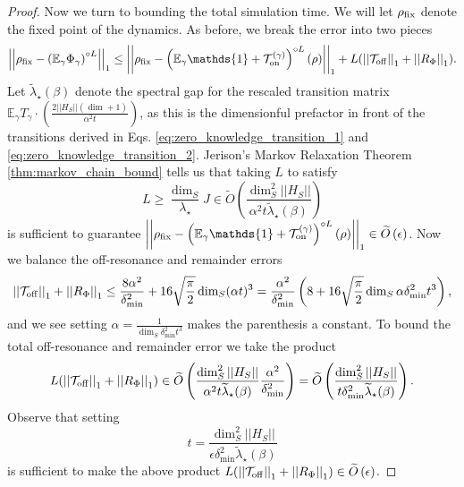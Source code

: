 \documentclass{article}
\newcommand{\on}{\rm on}
\newcommand{\off}{\rm off}
\newcommand{\norm}[1]{\left|\left| #1 \right|\right|}
\newcommand{\EE}{\mathbb{E}}
\newcommand{\TT}{\mathcal{T}}
\newcommand{\bigotilde}[1]{\widetilde{O} \left( #1 \right)}
\newcommand{\identity}{\mathds{1}}
\begin{document}
\begin{proof}
    Now we turn to bounding the total simulation time. We will let $\rho_{\rm fix}$ denote the fixed point of the dynamics. As before, we break the error into two pieces
    \begin{equation}
        \norm{\rho_{\rm fix} - \left(\EE_\gamma \Phi_\gamma \right)^{\circ L}}_1 \le \norm{\rho_{\rm fix} - \left(\EE_\gamma \identity + \TT_{\on}^{(\gamma)}\right)^{\circ L} (\rho)}_1 + L(\norm{\TT_{\off}}_1 + \norm{R_{\Phi}}_1).
    \end{equation}
    Let $\widetilde{\lambda}_\star(\beta)$ denote the spectral gap for the rescaled transition matrix $\EE_\gamma T_\gamma \cdot \left(\frac{2 \norm{H_S} (\dim + 1)}{\alpha^2 t}\right)$, as this is the dimensionful prefactor in front of the transitions derived in Eqs. \eqref{eq:zero_knowledge_transition_1} and \eqref{eq:zero_knowledge_transition_2}. Jerison's Markov Relaxation Theorem \ref{thm:markov_chain_bound} tells us that taking $L$ to satisfy
    \begin{equation}
        L \ge \frac{\dim_S}{\lambda_\star} J \in \bigotilde{\frac{\dim_S^2 \norm{H_S}}{\alpha^2 t \widetilde{\lambda}_\star(\beta)}}
    \end{equation}
    is sufficient to guarantee $\norm{\rho_{\rm fix} - \left(\EE_\gamma \identity + \TT_{\on}^{(\gamma)}\right)^{\circ L} (\rho)}_1 \in \bigotilde{\epsilon}$. Now we balance the off-resonance and remainder errors
    \begin{equation}
        \norm{\TT_{\off}}_1 + \norm{R_{\Phi}}_1 \le \frac{8 \alpha^2}{\delta_{\min}^2} + 16 \sqrt{\frac{\pi}{2}} \dim_S (\alpha t)^3 = \frac{\alpha^2}{\delta_{\min}^2} \left( 8 + 16 \sqrt{\frac{\pi}{2}} \dim_S \alpha \delta_{\min}^2 t^3 \right),
    \end{equation}
    and we see setting $\alpha = \frac{1}{\dim_S \delta_{\min}^2 t^3}$ makes the parenthesis a constant.
    To bound the total off-resonance and remainder error we take the product
    \begin{equation}
        L(\norm{\TT_{\off}}_1 + \norm{R_{\Phi}}_1) \in \bigotilde{\frac{\dim_S^2 \norm{H_S}}{\alpha^2 t \widetilde{\lambda}_\star(\beta)} \frac{\alpha^2}{\delta_{\min}^2}} = \bigotilde{\frac{\dim_S^2 \norm{H_S}}{ t \delta_{\min}^2 \widetilde{\lambda}_\star(\beta)} }.
    \end{equation}
    Observe that setting 
    \begin{equation}
        t = \frac{\dim_S^2 \norm{H_S}}{\epsilon \delta_{\min}^2 \widetilde{\lambda}_\star(\beta)}
    \end{equation} 
    is sufficient to make the above product $L(\norm{\TT_{\off}}_1 + \norm{R_{\Phi}}_1) \in\bigotilde{\epsilon}$. 


\end{proof}
\end{document}

